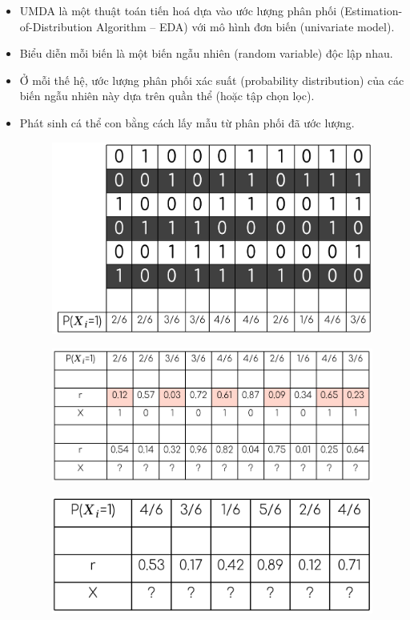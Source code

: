 \documentclass{book}
\begin{document}
                \begin{itemize}
                    \item UMDA là một thuật toán tiến hoá dựa vào ước lượng phân phối (Estimation-of-Distribution Algorithm – EDA) với mô hình đơn biến (univariate model).
                    \item Biểu diễn mỗi biến là một biến ngẫu nhiên (random variable) độc lập nhau.
                    \item Ở mỗi thế hệ, ước lượng phân phối xác suất (probability distribution) của các biến ngẫu nhiên này dựa trên quần thể (hoặc tập chọn lọc).
                    \item Phát sinh cá thể con bằng cách lấy mẫu từ phân phối đã ước lượng.
                    \begin{figure}[H]
                        \centering
                        \includegraphics[width=0.7\linewidth]{images/UMDA1.png}
                        \label{fig:UMDA1}
                    \end{figure}
                    \begin{figure}[H]
                        \centering
                        \includegraphics[width=0.7\linewidth]{images/UMDA2.png}
                        \label{fig:UMDA2}
                    \end{figure}
                    \begin{figure}[H]
                        \centering
                        \includegraphics[width=0.7\linewidth]{images/UMDA3.png}
                        \label{fig:UMDA3}
                    \end{figure}
                \end{itemize}
            
\end{document}
